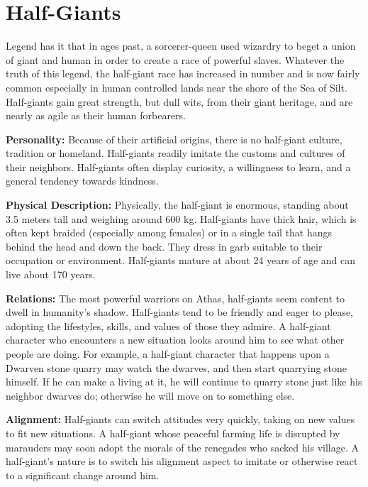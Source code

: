 \section{Half-Giants}

Legend has it that in ages past, a sorcerer-queen used wizardry to beget a union of giant and human in order to create a race of powerful slaves. Whatever the truth of this legend, the half-giant race has increased in number and is now fairly common especially in human controlled lands near the shore of the Sea of Silt. Half-giants gain great strength, but dull wits, from their giant heritage, and are nearly as agile as their human forbearers.


\textbf{Personality:} Because of their artificial origins, there is no half-giant culture, tradition or homeland. Half-giants readily imitate the customs and cultures of their neighbors. Half-giants often display curiosity, a willingness to learn, and a general tendency towards kindness.

\textbf{Physical Description:} Physically, the half-giant is enormous, standing about 3.5 meters tall and weighing around 600 kg. Half-giants have thick hair, which is often kept braided (especially among females) or in a single tail that hangs behind the head and down the back. They dress in garb suitable to their occupation or environment. Half-giants mature at about 24 years of age and can live about 170 years.

\textbf{Relations:} The most powerful warriors on Athas, half-giants seem content to dwell in humanity's shadow. Half-giants tend to be friendly and eager to please, adopting the lifestyles, skills, and values of those they admire. A half-giant character who encounters a new situation looks around him to see what other people are doing. For example, a half-giant character that happens upon a Dwarven stone quarry may watch the dwarves, and then start quarrying stone himself. If he can make a living at it, he will continue to quarry stone just like his neighbor dwarves do; otherwise he will move on to something else.

\textbf{Alignment:} Half-giants can switch attitudes very quickly, taking on new values to fit new situations. A half-giant whose peaceful farming life is disrupted by marauders may soon adopt the morals of the renegades who sacked his village. A half-giant's nature is to switch his alignment aspect to imitate or otherwise react to a significant change around him.

